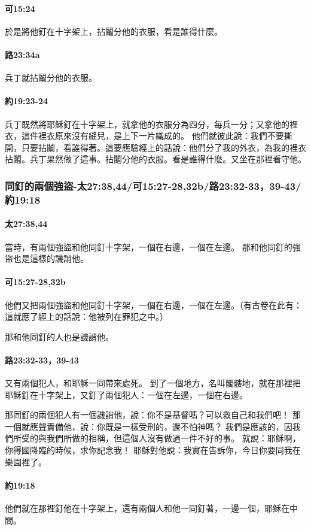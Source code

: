 \paragraph{可15:24}
於是將他釘在十字架上，拈鬮分他的衣服，看是誰得什麼。
\paragraph{路23:34a}
兵丁就拈鬮分他的衣服。
\paragraph{約19:23-24}
兵丁既然將耶穌釘在十字架上，就拿他的衣服分為四分，每兵一分；又拿他的裡衣，這件裡衣原來沒有縫兒，是上下一片織成的。
他們就彼此說：我們不要撕開，只要拈鬮，看誰得著。這要應驗經上的話說：他們分了我的外衣，為我的裡衣拈鬮。兵丁果然做了這事。拈鬮分他的衣服。看是誰得什麼。又坐在那裡看守他。

\subsubsection{同釘的兩個強盜-太27:38,44/可15:27-28,32b/路23:32-33，39-43/約19:18}
\paragraph{太27:38,44}
當時，有兩個強盜和他同釘十字架，一個在右邊，一個在左邊。
那和他同釘的強盜也是這樣的譏誚他。
\paragraph{可15:27-28,32b}
他們又把兩個強盜和他同釘十字架，一個在右邊，一個在左邊。（有古卷在此有：這就應了經上的話說：他被列在罪犯之中。）

那和他同釘的人也是譏誚他。
\paragraph{路23:32-33，39-43}
又有兩個犯人，和耶穌一同帶來處死。
到了一個地方，名叫髑髏地，就在那裡把耶穌釘在十字架上，又釘了兩個犯人：一個在左邊，一個在右邊。

那同釘的兩個犯人有一個譏誚他，說：你不是基督嗎？可以救自己和我們吧！
那一個就應聲責備他，說：你既是一樣受刑的，還不怕神嗎？
我們是應該的，因我們所受的與我們所做的相稱，但這個人沒有做過一件不好的事。
就說：耶穌啊，你得國降臨的時候，求你記念我！
耶穌對他說：我實在告訴你，今日你要同我在樂園裡了。
\paragraph{約19:18}
他們就在那裡釘他在十字架上，還有兩個人和他一同釘著，一邊一個，耶穌在中間。

